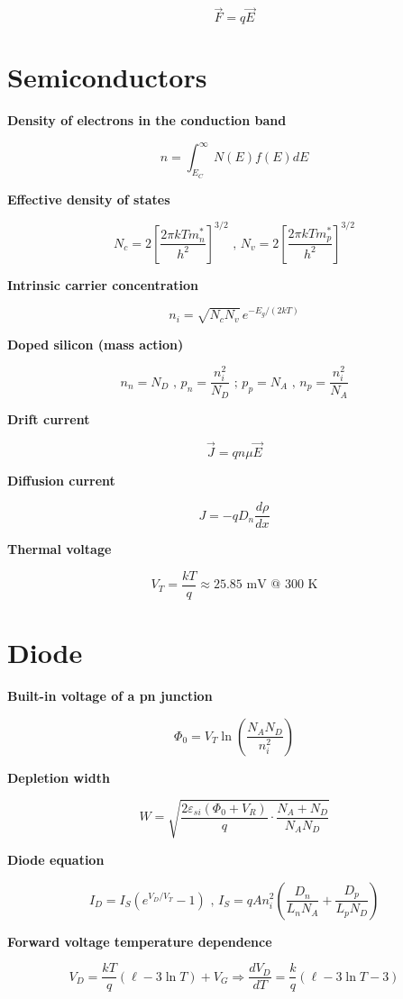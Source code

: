 \[ \vec{F} = q\vec{E} \]

\section{Semiconductors}\label{semiconductors}

\textbf{Density of electrons in the conduction band}

\[ n = \int_{E_C}^{\infty} N(E) f(E) dE \]

\textbf{Effective density of states}

\[ N_c = 2 \left[\frac{2 \pi k T m_n^*}{h^2}\right]^{3/2} \text{ , } N_v = 2 \left[\frac{2 \pi k T m_p^*}{h^2}\right]^{3/2} \]

\textbf{Intrinsic carrier concentration}

\[ n_i = \sqrt{N_c N_v}\, e^{-E_g/(2 k T)} \]

\textbf{Doped silicon (mass action)}

\[ n_n = N_D \text{ , } p_n = \frac{n_i^2}{N_D} \text{ ; } p_p = N_A \text{ , } n_p = \frac{n_i^2}{N_A} \]

\textbf{Drift current}

\[ \vec{J} = q n \mu \vec{E} \]

\textbf{Diffusion current}

\[ J = -q D_n \frac{d\rho}{dx} \]

\textbf{Thermal voltage}

\[ V_T = \frac{kT}{q} \approx 25.85\text{ mV @ 300 K} \]

\section{Diode}\label{diode}

\textbf{Built-in voltage of a pn junction}

\[ \Phi_0 = V_T \ln\left(\frac{N_A N_D}{n_i^2}\right) \]

\textbf{Depletion width}

\[ W = \sqrt{\frac{2 \varepsilon_{si} (\Phi_0 + V_R)}{q} \cdot \frac{N_A + N_D}{N_A N_D}} \]

\textbf{Diode equation}

\[ I_D = I_S\left(e^{V_D/V_T} - 1\right) \text{ , } I_S = q A n_i^2 \left( \frac{D_n}{L_n N_A} + \frac{D_p}{L_p N_D}\right) \]

\textbf{Forward voltage temperature dependence}

\[ V_D = \frac{kT}{q}(\ell - 3 \ln T) + V_G \Rightarrow \frac{dV_D}{dT} = \frac{k}{q}\left(\ell - 3\ln T - 3\right) \]

